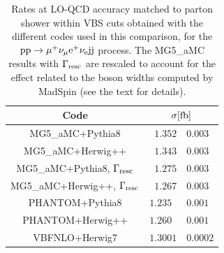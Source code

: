 \begin{table}[h!]
    \centering
    \begin{tabular}{c|r@{ $\pm$ }l}
      Code  &  \multicolumn{2}{c}{$\sigma[\rm{fb}]$}  \\
        \hline\hline
        {\sc MG5\_aMC}+{\sc Pythia8}&  $1.352 $ & $0.003$  \\
        {\sc MG5\_aMC}+{\sc Herwig++}&  $1.343 $ & $ 0.003$  \\
        {\sc MG5\_aMC}+{\sc Pythia8}, $\Gamma_{\rm resc}$&  $1.275$ & $0.003$  \\
        {\sc MG5\_aMC}+{\sc Herwig++}, $\Gamma_{\rm resc}$&  $1.267$ & $ 0.003$  \\
        {\sc PHANTOM}+{\sc Pythia8} &  $1.235\phantom{0} $ & $0.001$  \\
        {\sc PHANTOM}+{\sc Herwig++} &  $1.260\phantom{0} $ & $0.001$  \\
        {\sc VBFNLO}+{\sc Herwig7} &  $1.3001$ & $0.0002$  \\
    \end{tabular}
    \caption{\label{tab:PSratesLO} Rates at LO-QCD accuracy matched to parton shower within VBS cuts obtained with the different codes used in this comparison,
    for the ${\rm p}{\rm p}\to\mu^+\nu_\mu{\rm e}^+\nu_{\rm e}{\rm j}{\rm j}$ process. The {\sc MG5\_aMC} results with $\Gamma_{\rm resc}$ 
    are rescaled to account for the effect related to the boson widths computed by {\sc MadSpin} (see the text for details).}
\end{table}

